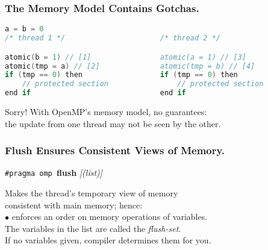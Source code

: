 \begin{frame}[fragile]
  \frametitle{The Memory Model Contains Gotchas.}

  \begin{lstlisting}[language=C,morekeywords={foreach,pragma,omp,parallel,single,nowait,task,untied,barrier,taskyield,mergeable,final,taskwait,critical}]
                    a = b = 0
/* thread 1 */                      /* thread 2 */

atomic(b = 1) // [1]                atomic(a = 1) // [3]
atomic(tmp = a) // [2]              atomic(tmp = b) // [4]
if (tmp == 0) then                  if (tmp == 0) then
    // protected section                // protected section
end if                              end if
  \end{lstlisting}

  
  \begin{changemargin}{1cm}
\large
    Sorry! With OpenMP's memory model, no guarantees:\\
    the update from one thread may not be seen by the other.
  \end{changemargin}

\end{frame}

\begin{frame}[fragile]
  \frametitle{Flush Ensures Consistent Views of Memory.}
\large
  \begin{center}
    {\tt \#pragma omp }{\bf flush} {\it[(list)]}
  \end{center}

\large
  \begin{changemargin}{1cm}
    Makes the thread's temporary view of memory \\ consistent with main
      memory; hence:\\[1em]
    $\bullet$ enforces an order on memory operations of variables.\\[1em]
    The variables in the list are called the {\it flush-set}. \\
    If no variables given, compiler determines them for you.
  \end{changemargin}
  
\end{frame}

